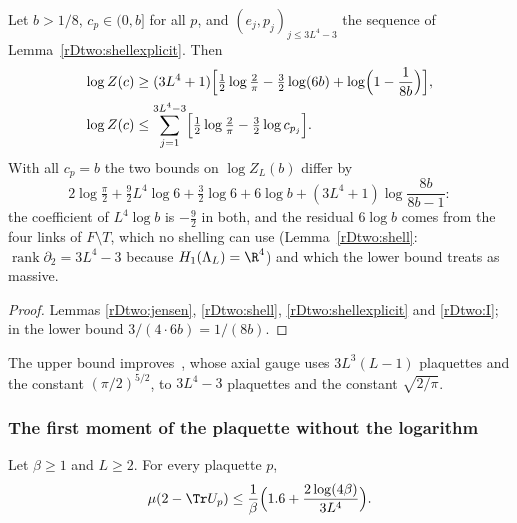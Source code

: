 \begin{proposition}\label{rDtwo:freeenergy}
Let $b>1/8$, $c_p\in(0,b]$ for all $p$, and $(e_j,p_j)_{j\le3L^4-3}$ the
sequence of Lemma~\ref{rDtwo:shellexplicit}. Then
\[
\begin{split}
\log Z(c)&\ge(3L^4+1)\Bigl[\tfrac12\log\tfrac2\pi-\tfrac32\log(6b)+\log\Bigl(1-
\frac1{8b}\Bigr)\Bigr],\\
\log Z(c)&\le\sum_{j=1}^{3L^4-3}\Bigl[\tfrac12\log\tfrac2\pi-\tfrac32\log c_{p_j}
\Bigr].
\end{split}
\]
With all $c_p=b$ the two bounds on $\log Z_L(b)$ differ by
\[
2\log\tfrac\pi2+\tfrac92L^4\log6+\tfrac32\log6+6\log b+(3L^4+1)\log\frac{8b}
{8b-1}:
\]
the coefficient of $L^4\log b$ is $-\frac92$ in both, and the residual
$6\log b$ comes from the four links of $F\setminus T$, which no shelling
can use (Lemma~\ref{rDtwo:shell}: $\operatorname{rank}\partial_2=3L^4-3$
because $H_1(\Lambda_L)=\R^4$) and which the lower bound treats as massive.
\end{proposition}

\begin{proof}
Lemmas \ref{rDtwo:jensen}, \ref{rDtwo:shell}, \ref{rDtwo:shellexplicit} and
\ref{rDtwo:I}; in the lower bound $3/(4\cdot6b)=1/(8b)$.
\end{proof}

The upper bound improves~\cite[Lemma~475]{BBLR26}, whose axial gauge uses $3L^3(L-1)$ plaquettes
and the constant $(\pi/2)^{5/2}$, to $3L^4-3$ plaquettes and the constant
$\sqrt{2/\pi}$.

\subsubsection{The first moment of the plaquette without the logarithm}

\begin{theorem}\label{rDtwo:firstmoment}
Let $\beta\ge1$ and $L\ge2$. For every plaquette $p$,
\[
\mu(2-\Tr U_p)\le\frac1\beta\Bigl(1.6+\frac{2\log(4\beta)}{3L^4}\Bigr).
\]
\end{theorem}

